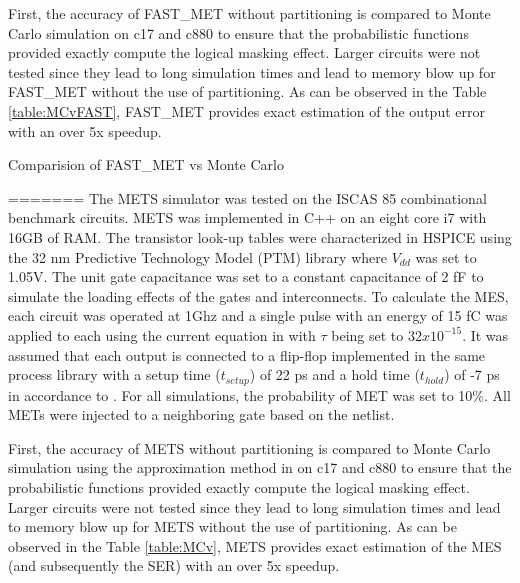 \documentclass[conference]{IEEEtran}
\begin{document}
\begin{algorithm}
First, the accuracy of FAST\_MET without partitioning is compared to Monte Carlo simulation on c17 and c880 to ensure that the probabilistic functions provided exactly compute the logical masking effect. Larger circuits were not tested since they lead to long simulation times and lead to memory blow up for FAST\_MET without the use of partitioning. As can be observed in the Table \ref{table:MCvFAST}, FAST\_MET provides exact estimation of the output error with an over 5x speedup.

\begin{table}[ht]
	\begin{center}
		\caption{Comparision of FAST\_MET vs Monte Carlo}
		\label{table:MCvFAST}
=======
The METS simulator was tested on the ISCAS 85 combinational benchmark circuits. METS was implemented in C++ on an eight core i7 with 16GB of RAM. The transistor look-up tables were characterized in HSPICE using the 32 nm Predictive Technology Model (PTM) library \cite{PTM} where $V_{dd}$ was set to 1.05V. The unit gate capacitance was set to a constant capacitance of 2 fF to simulate the loading effects of the gates and interconnects. To calculate the MES, each circuit was operated at 1Ghz and a single pulse with an energy of 15 fC was applied to each using the current equation in \cite{Ziegler1996} with $\tau$ being set to $32x10^{-15}$. It was assumed that each output is connected to a flip-flop implemented in the same process library with a setup time ($t_{setup}$) of 22 ps and a hold time ($t_{hold}$) of -7 ps in accordance to \cite{Nunes2013}. For all simulations, the probability of MET was set to 10\%. All METs were injected to a neighboring gate based on the netlist.

First, the accuracy of METS without partitioning is compared to Monte Carlo simulation using the approximation method in \cite{Watkins2016} on c17 and c880 to ensure that the probabilistic functions provided exactly compute the logical masking effect. Larger circuits were not tested since they lead to long simulation times and lead to memory blow up for METS without the use of partitioning. As can be observed in the Table \ref{table:MCv}, METS provides exact estimation of the MES (and subsequently the SER) with an over 5x speedup. 


\end{center}
\end{table}
\end{algorithm}
\end{document}
